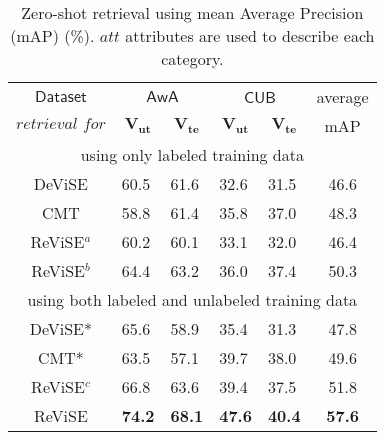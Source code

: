 {\begin{table}[t!]
\centering
\caption{\footnotesize Zero-shot retrieval using mean Average Precision (mAP) (\%). $\textit{att}$ attributes are used to describe each category.}
\vspace{1mm}
\scalebox{0.72}
{
\begin{tabular}{|c||ll||ll||c|}
\hline
$\mathsf{Dataset}$ & \multicolumn{2}{c||}{$\mathsf{AwA}$}                                                      & \multicolumn{2}{c||}{$\mathsf{CUB}$}                                                     & average                          \\
                    $\textit{retrieval for}$    & \multicolumn{1}{c}{$\mathbf{V_{ut}}$} & \multicolumn{1}{c||}{$\mathbf{V_{te}}$} & \multicolumn{1}{c}{$\mathbf{V_{ut}}$} & \multicolumn{1}{c||}{$\mathbf{V_{te}}$} & mAP \\ \hline\hline
\multicolumn{6}{|c|}{using only labeled training data}                                                                                                                                                                                     \\ \hline \hline
DeViSE \cite{frome2013devise}                         &        60.5        &      61.6       &         32.6           &              31.5            &        46.6           \\
CMT \cite{socher2013zero}                 &         58.8          &       61.4     &       35.8   &        37.0         &   48.3          \\
ReViSE$^a$        &     60.2        &    60.1       &    33.1      &       32.0    &       46.4          \\
ReViSE$^b$        &     64.4      &     63.2     &     36.0        &              37.4            &      50.3             \\ \hline \hline
\multicolumn{6}{|c|}{using both labeled and unlabeled training data}   \\ \hline \hline
DeViSE* \cite{frome2013devise}             &    65.6      &       58.9       &           35.4     &          31.3          &    47.8                \\
CMT* \cite{socher2013zero}       &    63.5    &    57.1    &     39.7     &              38.0          &   49.6            \\
ReViSE$^c$        &    66.8         &     63.6     &     39.4      &    37.5   &       51.8       \\
ReViSE       &    {\bf 74.2 }       &     {\bf 68.1 }   &    {\bf 47.6 }      &  {\bf 40.4  }    &        {\bf 57.6}      \\ \hline
\end{tabular}
}
\label{tbl:induc_zero_retr}
\vspace{-4mm}
\end{table}



}
